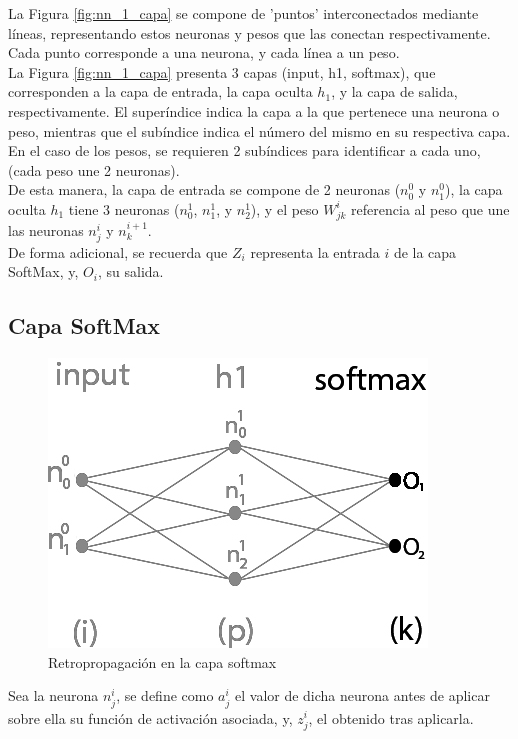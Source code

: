 La Figura \ref{fig:nn_1_capa} se compone de 'puntos' interconectados mediante líneas, representando estos neuronas y pesos que las conectan respectivamente. Cada punto corresponde a una neurona, y cada línea a un peso. \\
La Figura \ref{fig:nn_1_capa} presenta 3 capas (input, h1, softmax), que corresponden a la capa de entrada, la capa oculta $h_1$, y la capa de salida, respectivamente. El superíndice indica la capa a la que pertenece una neurona o peso, mientras que el subíndice indica el número del mismo en su respectiva capa. En el caso de los pesos, se requieren 2 subíndices para identificar a cada uno, (cada peso une 2 neuronas). \\
De esta manera, la capa de entrada se compone de 2 neuronas ($n^{0}_0$ y $n^{0}_1$), la capa oculta $h_1$ tiene 3 neuronas ($n^1_{0}$, $n^1_{1}$, y $n^1_{2}$), y el peso $W^{i}_{jk}$ referencia al peso que une las neuronas $n^{i}_j$ y $n^{i+1}_k$.\\
De forma adicional, se recuerda que $Z_i$ representa la entrada $i$ de la capa SoftMax, y, $O_i$, su salida.  

\subsection{Capa SoftMax}

\begin{figure}[H]
	\centering
	\includegraphics[scale=0.35]{imagenes/nn_1_capa_output.jpg}  
	\caption{Retropropagación en la capa softmax}
	\label{fig:nn_1_capa_output}
\end{figure}

Sea la neurona $n^i_j$, se define como $a^i_j$ el valor de dicha neurona antes de aplicar sobre ella su función de activación asociada, y, $z^i_j$, el obtenido tras aplicarla. 

